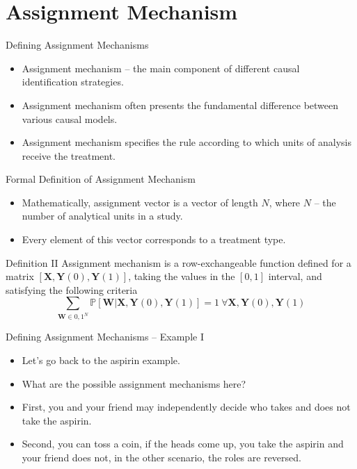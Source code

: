 \documentclass{beamer}
\begin{document}
\section{Assignment Mechanism}
\begin{frame}{Defining Assignment Mechanisms}
\begin{itemize}
	\setlength\itemsep{1em}
	\item Assignment mechanism -- the main component of different causal identification strategies.
	\item Assignment mechanism often presents the fundamental difference between various causal models. 
	\item Assignment mechanism specifies the rule according to which units of analysis receive the treatment. 
\end{itemize}
\end{frame}
\begin{frame}{Formal Definition of Assignment Mechanism}
\begin{itemize}
\item Mathematically, assignment vector is a vector of length $N$, where $N$ -- the number of analytical units in a study. 
\item Every element of this vector corresponds to a treatment type. 
\end{itemize}
\begin{block}{Definition II}
Assignment mechanism is a row-exchangeable function defined for a matrix $[\mathbf{X}, \mathbf{Y}(0),\mathbf{Y}(1)]$, taking the values in the $[0,1]$ interval, and satisfying the following criteria $$\sum_{\mathbf{W} \in {0,1}^N} \mathbb{P}[\mathbf{W}|\mathbf{X},\mathbf{Y}(0), \mathbf{Y}(1)] = 1 \ \forall \mathbf{X}, \mathbf{Y}(0), \mathbf{Y}(1)$$
\end{block}
\end{frame}
\begin{frame}{Defining Assignment Mechanisms -- Example I}
\begin{itemize}
\setlength\itemsep{1em}
\item Let's go back to the aspirin example. 
\item What are the possible assignment mechanisms here? 
\item First, you and your friend may independently decide who takes and does not take the aspirin. 
\item Second, you can toss a coin, if the heads come up, you take the aspirin and your friend does not, in the other scenario, the roles are reversed.  
\end{itemize}
\end{frame}
\end{document}
